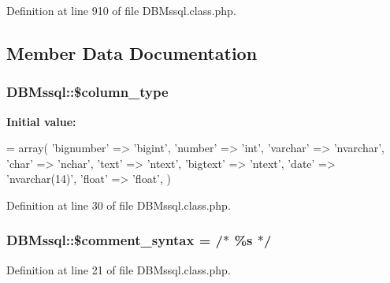 Definition at line 910 of file D\+B\+Mssql.\+class.\+php.



\subsection{Member Data Documentation}
\hypertarget{classDBMssql_a785e589df00c87bb0003b573aa5d7fee}{}
\subsubsection[{\$column\+\_\+type}]{\setlength{\rightskip}{0pt plus 5cm}D\+B\+Mssql\+::\$column\+\_\+type}\label{classDBMssql_a785e589df00c87bb0003b573aa5d7fee}
{\bfseries Initial value\+:}
\begin{DoxyCode}
= array(
        \textcolor{stringliteral}{'bignumber'} => \textcolor{stringliteral}{'bigint'},
        \textcolor{stringliteral}{'number'} => \textcolor{stringliteral}{'int'},
        \textcolor{stringliteral}{'varchar'} => \textcolor{stringliteral}{'nvarchar'},
        \textcolor{stringliteral}{'char'} => \textcolor{stringliteral}{'nchar'},
        \textcolor{stringliteral}{'text'} => \textcolor{stringliteral}{'ntext'},
        \textcolor{stringliteral}{'bigtext'} => \textcolor{stringliteral}{'ntext'},
        \textcolor{stringliteral}{'date'} => \textcolor{stringliteral}{'nvarchar(14)'},
        \textcolor{stringliteral}{'float'} => \textcolor{stringliteral}{'float'},
    )
\end{DoxyCode}


Definition at line 30 of file D\+B\+Mssql.\+class.\+php.

\hypertarget{classDBMssql_ad095d953d508f44a326586a10c95336d}{}
\subsubsection[{\$comment\+\_\+syntax}]{\setlength{\rightskip}{0pt plus 5cm}D\+B\+Mssql\+::\$comment\+\_\+syntax = \textquotesingle{}/$\ast$ \%s $\ast$/\textquotesingle{}}\label{classDBMssql_ad095d953d508f44a326586a10c95336d}


Definition at line 21 of file D\+B\+Mssql.\+class.\+php.

\hypertarget{classDBMssql_a352ee40852cea6dc20de096486603805}{}
